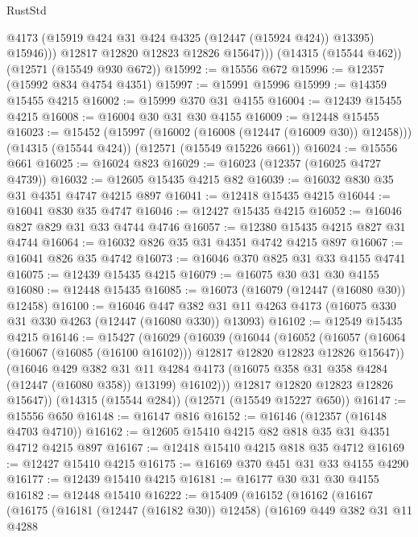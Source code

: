 \begin{lexlean}{RustStd}
\begin{coremodule}
                @4173
                (@15919 @424 @31 @424 @4325 (@12447 (@15924 @424)) @13395)
                @15946)))
          @12817
          @12820
          @12823
          @12826
          @15647)))
    (@14315 (@15544 @462))
    (@12571 (@15549 @930 @672))
@15992 := @15556 @672
@15996 := @12357 (@15992 @834 @4754 @4351)
@15997 := @15991 @15996
@15999 := @14359 @15455 @4215
@16002 := @15999 @370 @31 @4155
@16004 := @12439 @15455 @4215
@16008 := @16004 @30 @31 @30 @4155
@16009 := @12448 @15455
@16023 := @15452
    (@15997 (@16002 (@16008 (@12447 (@16009 @30)) @12458)))
    (@14315 (@15544 @424))
    (@12571 (@15549 @15226 @661))
@16024 := @15556 @661
@16025 := @16024 @823
@16029 := @16023 (@12357 (@16025 @4727 @4739))
@16032 := @12605 @15435 @4215 @82
@16039 := @16032 @830 @35 @31 @4351 @4747 @4215 @897
@16041 := @12418 @15435 @4215
@16044 := @16041 @830 @35 @4747
@16046 := @12427 @15435 @4215
@16052 := @16046 @827 @829 @31 @33 @4744 @4746
@16057 := @12380 @15435 @4215 @827 @31 @4744
@16064 := @16032 @826 @35 @31 @4351 @4742 @4215 @897
@16067 := @16041 @826 @35 @4742
@16073 := @16046 @370 @825 @31 @33 @4155 @4741
@16075 := @12439 @15435 @4215
@16079 := @16075 @30 @31 @30 @4155
@16080 := @12448 @15435
@16085 := @16073 (@16079 (@12447 (@16080 @30)) @12458)
@16100 := @16046
    @447
    @382
    @31
    @11
    @4263
    @4173
    (@16075 @330 @31 @330 @4263 (@12447 (@16080 @330)) @13093)
@16102 := @12549 @15435 @4215
@16146 := @15427
    (@16029
      (@16039
        (@16044
          (@16052
            (@16057 (@16064 (@16067 (@16085 (@16100 @16102))) @12817 @12820 @12823 @12826 @15647))
            (@16046
              @429
              @382
              @31
              @11
              @4284
              @4173
              (@16075 @358 @31 @358 @4284 (@12447 (@16080 @358)) @13199)
              @16102)))
        @12817
        @12820
        @12823
        @12826
        @15647))
    (@14315 (@15544 @284))
    (@12571 (@15549 @15227 @650))
@16147 := @15556 @650
@16148 := @16147 @816
@16152 := @16146 (@12357 (@16148 @4703 @4710))
@16162 := @12605 @15410 @4215 @82 @818 @35 @31 @4351 @4712 @4215 @897
@16167 := @12418 @15410 @4215 @818 @35 @4712
@16169 := @12427 @15410 @4215
@16175 := @16169 @370 @451 @31 @33 @4155 @4290
@16177 := @12439 @15410 @4215
@16181 := @16177 @30 @31 @30 @4155
@16182 := @12448 @15410
@16222 := @15409
    (@16152
      (@16162
        (@16167
          (@16175
            (@16181 (@12447 (@16182 @30)) @12458)
            (@16169
              @449
              @382
              @31
              @11
              @4288

\end{coremodule}
\end{lexlean}
